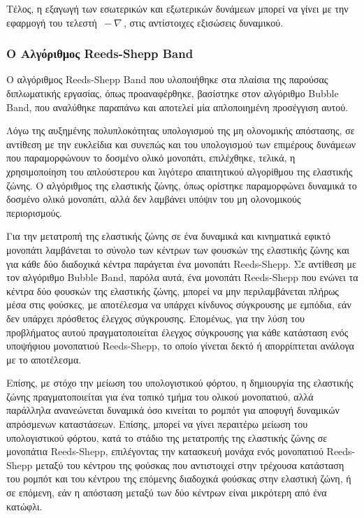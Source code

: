 \bigskip
Τέλος, η εξαγωγή των εσωτερικών και εξωτερικών δυνάμεων μπορεί να γίνει με την εφαρμογή του τελεστή $\,-\nabla\,$, στις αντίστοιχες εξισώσεις δυναμικού.

\subsubsection{Ο Αλγόριθμος Reeds-Shepp Band} \label{sssec:rsband}
Ο αλγόριθμος Reeds-Shepp Band που υλοποιήθηκε στα πλαίσια της παρούσας διπλωματικής εργασίας, όπως προαναφέρθηκε, βασίστηκε στον αλγόριθμο Bubble Band, που αναλύθηκε παραπάνω και αποτελεί μία απλοποιημένη προσέγγιση αυτού. 

\bigskip
Λόγω της αυξημένης πολυπλοκότητας υπολογισμού της μη ολονομικής απόστασης, σε αντίθεση με την ευκλείδια και συνεπώς και του υπολογισμού των επιμέρους δυνάμεων που παραμορφώνουν το δοσμένο ολικό μονοπάτι, επιλέχθηκε, τελικά, η χρησιμοποίηση του απλούστερου και λιγότερο απαιτητικού αλγορίθμου της ελαστικής ζώνης. Ο αλγόριθμος της ελαστικής ζώνης, όπως ορίστηκε παραμορφώνει δυναμικά το δοσμένο ολικό μονοπάτι, αλλά δεν λαμβάνει υπόψιν του μη ολονομικούς περιορισμούς. 

\bigskip
Για την μετατροπή της ελαστικής ζώνης σε ένα δυναμικά και κινηματικά εφικτό μονοπάτι λαμβάνεται το σύνολο των κέντρων των φουσκών της ελαστικής ζώνης και για κάθε δύο διαδοχικά κέντρα παράγεται ένα μονοπάτι Reeds-Shepp. Σε αντίθεση με τον αλγόριθμο Bubble Band, παρόλα αυτά, ένα μονοπάτι Reeds-Shepp που ενώνει τα κέντρα δύο φουσκών της ελαστικής ζώνης, μπορεί να μην περιλαμβάνεται πλήρως μέσα στις φούσκες, με αποτέλεσμα να υπάρχει κίνδυνος σύγκρουσης με εμπόδια, εάν δεν υπάρχει πρόσθετος έλεγχος σύγκρουσης. Επομένως, για την λύση του προβλήματος αυτού πραγματοποιείται έλεγχος σύγκρουσης για κάθε κατάσταση ενός υποψήφιου μονοπατιού Reeds-Shepp, το οποίο γίνεται δεκτό ή απορρίπτεται ανάλογα με το αποτέλεσμα.

\bigskip
Επίσης, με στόχο την μείωση του υπολογιστικού φόρτου, η δημιουργία της ελαστικής ζώνης πραγματοποιείται για ένα τοπικό τμήμα του ολικού μονοπατιού, αλλά παράλληλα ανανεώνεται δυναμικά όσο κινείται το ρομπότ για αποφυγή δυναμικών απρόσμενων καταστάσεων. Επίσης, μπορεί να γίνει περαιτέρω μείωση του υπολογιστικού φόρτου, κατά το στάδιο της μετατροπής της ελαστικής ζώνης σε μονοπάτια Reeds-Shepp, επιλέγοντας την κατασκευή μονάχα ενός μονοπατιού Reeds-Shepp μεταξύ του κέντρου της φούσκας που αντιστοιχεί στην τρέχουσα κατάσταση του ρομπότ και του κέντρου της επόμενης διαδοχικά φούσκας στην ελαστική ζώνη, ή σε επόμενη, εάν η απόσταση μεταξύ των δύο κέντρων είναι μικρότερη από ένα κατώφλι.

